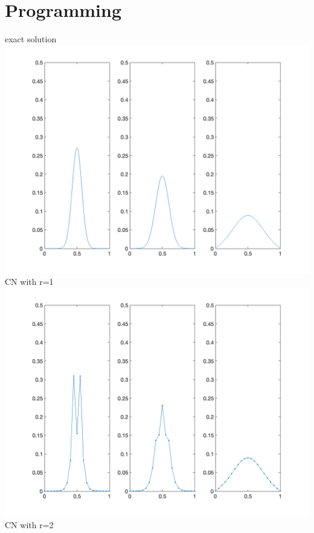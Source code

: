 \documentclass{article}
\begin{document}
\section{Programming}
exact solution\\
\includegraphics[scale = 0.25]{exact_solution.png}\\
CN with r=1\\
\includegraphics[scale = 0.25]{CN_1.png}\\
CN with r=2\\
\end{document}

